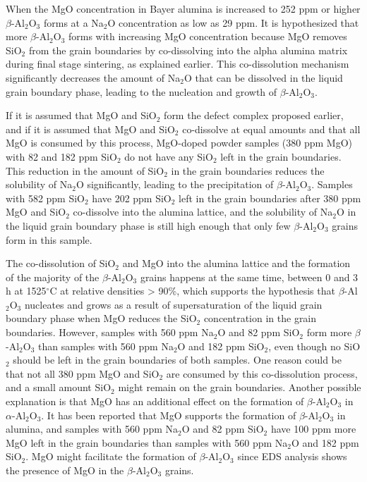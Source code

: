 When the MgO concentration in Bayer alumina is increased to 252 ppm or higher $\beta$-Al$_{2}$O$_{3}$ forms at a Na$_{2}$O concentration as low as 29 ppm. It is hypothesized that more $\beta$-Al$_{2}$O$_{3}$ forms with increasing MgO concentration because MgO removes SiO$_{2}$ from the grain boundaries by co-dissolving into the alpha alumina matrix during final stage sintering, as explained earlier. This co-dissolution mechanism significantly decreases the amount of Na$_{2}$O that can be dissolved in the liquid grain boundary phase, leading to the nucleation and growth of $\beta$-Al$_{2}$O$_{3}$. 

If it is assumed that MgO and SiO$_{2}$ form the defect complex proposed earlier, and if it is assumed that MgO and SiO$_{2}$ co-dissolve at equal amounts and that all MgO is consumed by this process, MgO-doped powder samples (380 ppm MgO) with 82 and 182 ppm SiO$_{2}$ do not have any SiO$_{2}$ left in the grain boundaries. This reduction in the amount of SiO$_{2}$ in the grain boundaries reduces the solubility of Na$_{2}$O significantly, leading to the precipitation of $\beta$-Al$_{2}$O$_{3}$. Samples with 582 ppm SiO$_{2}$ have 202 ppm SiO$_{2}$ left in the grain boundaries after 380 ppm MgO and SiO$_{2}$ co-dissolve into the alumina lattice, and the solubility of Na$_{2}$O in the liquid grain boundary phase is still high enough that only few $\beta$-Al$_{2}$O$_{3}$ grains form in this sample. 

The co-dissolution of SiO$_{2}$ and MgO into the alumina lattice and the formation of the majority of the $\beta$-Al$_{2}$O$_{3}$ grains happens at the same time, between 0 and 3 h at 1525$^{\circ}$C at relative densities > 90\%, which supports the hypothesis that $\beta$-Al$_{2}$O$_{3}$ nucleates and grows as a result of supersaturation of the liquid grain boundary phase when MgO reduces the SiO$_{2}$ concentration in the grain boundaries. However, samples with 560 ppm Na$_{2}$O and 82 ppm SiO$_{2}$ form more $\beta$-Al$_{2}$O$_{3}$ than samples with 560 ppm Na$_{2}$O and 182 ppm SiO$_{2}$, even though no SiO$_{2}$ should be left in the grain boundaries of both samples. One reason could be that not all 380 ppm MgO and SiO$_{2}$ are consumed by this co-dissolution process, and a small amount SiO$_{2}$ might remain on the grain boundaries. Another possible explanation is that MgO has an additional effect on the formation of $\beta$-Al$_{2}$O$_{3}$ in $\alpha$-Al$_{2}$O$_{3}$. It has been reported that MgO supports the formation of $\beta$-Al$_{2}$O$_{3}$ in alumina, and samples with 560 ppm Na$_{2}$O and 82 ppm SiO$_{2}$ have 100 ppm more MgO left in the grain boundaries than samples with 560 ppm Na$_{2}$O and 182 ppm SiO$_{2}$. MgO might facilitate the formation of $\beta$-Al$_{2}$O$_{3}$ since EDS analysis shows the presence of MgO in the $\beta$-Al$_{2}$O$_{3}$ grains. 

